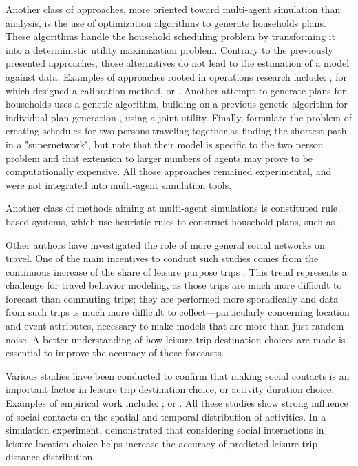 {Another class of approaches, more oriented toward multi-agent simulation than analysis, is the use of optimization algorithms to generate households plans. These algorithms handle the household scheduling problem by transforming it into a deterministic utility maximization problem. Contrary to the previously presented approaches, those alternatives do not lead to the estimation of a model against data. Examples of approaches rooted in operations research include: \citet{Recker_TRR_1995}, for which \citet{ChowRecker_TranResB_2012} designed a calibration method, or \citet{GanRecker_TransResB_2008}. Another attempt to generate plans for households uses a genetic algorithm, building on a previous genetic algorithm for individual plan generation \citep{CharyparNagel_Transportation_2005, MeisterEtAl_Transportation_2005}, using a joint utility. Finally, \citet{LiaoFEtAl_Transportation_2013} formulate the problem of creating schedules for two persons traveling together as finding the shortest path in a "supernetwork", but note that their model is specific to the two person problem and that extension to larger numbers of agents may prove to be computationally expensive. All those approaches remained experimental, and were not integrated into multi-agent simulation tools.

Another class of methods aiming at multi-agent simulations is constituted rule based systems, which use heuristic rules to construct household plans, such as \citet{MillerEtAl_Transportation_2005, ArentzeTimmermans_TransResB_2009}.

Other authors have investigated the role of more general social networks on travel. One of the main incentives to conduct such studies comes from the continuous increase of the share of leisure purpose trips  \citep{SchlichEtAl_TransportRev_2004,Axhausen_DonaghyEtAl_2005}. This trend represents a challenge for travel behavior modeling, as those trips are much more difficult to forecast than commuting trips; they are performed more sporadically and data from such trips is much more difficult to collect---particularly concerning location and event attributes, necessary to make models that are more than just random noise. A better understanding of how leisure trip destination choices are made is essential to improve the accuracy of those forecasts.

Various studies have been conducted to confirm that making social contacts is an important factor in leisure trip destination choice, or activity duration choice. Examples of empirical work include: \citet{CarrascoJAHabib_IATBR_2009}; \citet{HabibCarrascoJA_TRR_2011} or \citet{MooreJEtAl_Transportation_2013}. All these studies show strong influence of social contacts on the spatial and temporal distribution of activities. In a simulation experiment, \citet{Frei_PhDThesis_2012} demonstrated that considering social interactions in leisure location choice helps increase the accuracy of predicted leisure trip distance distribution.

}
